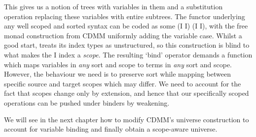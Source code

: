 This gives us a notion of trees with variables in them and a substitution
operation replacing these variables with entire subtrees.
%
The functor underlying any well scoped and sorted syntax can be coded as
some { (I \AR{$\times$}  I) (I \AR{$\times$}  I)},
with the free monad construction from CDMM uniformly adding the variable
case. Whilst a good start,  treats its index types as unstructured,
so this construction is blind to what makes the { I} index a
\emph{scope}. The resulting `bind' operator demands a function which maps
variables in \emph{any} sort and scope to terms in \emph{any} sort
and scope. However, the behaviour we need is to preserve sort while mapping
between specific source and target scopes which may differ. We need to
account for the fact that scopes change only by extension, and hence that our
specifically scoped operations can be pushed under binders by weakening.

We will see in the next chapter how to modify CDMM's universe construction
to account for variable binding and finally obtain a scope-aware universe.
